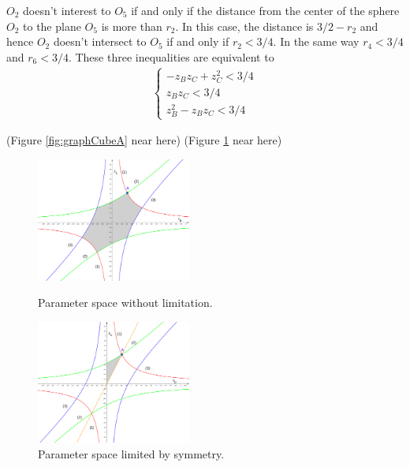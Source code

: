 \documentclass[suppldata, dvipdfmx]{interact}
\theoremstyle{plain}%
\theoremstyle{definition}
\theoremstyle{remark}
\theoremstyle{problemstyle}
\begin{document}
$O_2$ doesn't interest to $O_5$ if and only if the distance from the center
of the sphere $O_2$ to the plane $O_5$ is more than $r_2$. In this case,
the distance is $3 / 2 - r_2$ and hence $O_2$ doesn't intersect to $O_5$
if and only if $r_2 < 3/4$. In the same way $r_4 < 3/4$ and $r_6 <
3/4$. These three inequalities are equivalent to
\begin{align*}
\begin{cases}
 -z_Bz_C + z^2_C < 3 / 4\\
 z_Bz_C < 3 / 4 \tag{2.E}\label{2E}\\
 z^2_B - z_B z_C < 3/ 4
\end{cases}
\end{align*}

\noindent(Figure \ref{fig:graphCubeA} near here)
(Figure \ref{fig:graphCubeALimit} near here)

\begin{figure}[h!tbp]
 \begin{minipage}[t]{0.5\textwidth}
 \centering
 \includegraphics[width=2in,
 keepaspectratio]{./img/graph/cubeA.jpg}
 \caption{Parameter space without limitation.}
 \label{fig:graphCubeA}
 \end{minipage}
 \hspace*{\fill}
 \begin{minipage}[t]{0.5\textwidth}
  \centering
  \includegraphics[width=2in,
  keepaspectratio]{./img/graph/cubeALimit.jpg}
  \caption{Parameter space limited by symmetry.}
  \label{fig:graphCubeALimit}
 \end{minipage}
 \hspace*{\fill}
\end{figure}
\end{document}
